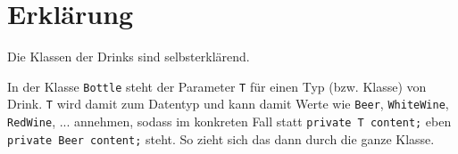 \documentclass{article}
\begin{document}
	\section*{Erklärung}
	Die Klassen der Drinks sind selbsterklärend.
	
	In der Klasse \texttt{Bottle} steht der Parameter \texttt{T} für einen Typ (bzw. Klasse) von Drink. \texttt{T} wird damit zum Datentyp und kann damit Werte wie \texttt{Beer}, \texttt{WhiteWine}, \texttt{RedWine}, ... annehmen, sodass im konkreten Fall statt \texttt{private T content;} eben \texttt{private Beer content;} steht. So zieht sich das dann durch die ganze Klasse.
	
\end{document}
